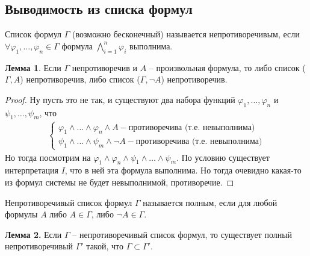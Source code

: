 \subsection{Выводимость из списка формул}
\begin{conj}
    Список формул $\Gamma$ (возможно бесконечный) называется непротиворечивым, если $\forall \varphi_1, \dots, \varphi_n \in \Gamma$ формула $\bigwedge\limits_{i = 1}^n \varphi_i$ выполнима.
\end{conj}

\vspace{2mm}

\textbf{Лемма 1}. Если $\Gamma$ непротиворечив и $A$ -- произвольная формула, то либо список ($\Gamma, A$) непротиворечив, либо список ($\Gamma, \neg A$) непротиворечив.  

\begin{proof}
    Ну пусть это не так, и существуют два набора функций $\varphi_1, \dots, \varphi_n$ и $\psi_1, \dots, \psi_m$, что \begin{gather*}
        \begin{cases}
            \varphi_1 \land \dots \land \varphi_n \land A - \text{противоречива (т.е. невыполнима)} \\
            \psi_1 \land \dots \land \psi_m \land \neg A - \text{противоречива (т.е. невыполнима)}
        \end{cases}
    \end{gather*}
    \quad Но тогда посмотрим на $\varphi_1 \land \varphi_n \land \psi_1 \land \dots \land \psi_m$. По условию существует интерпретация $I$, что в ней эта формула выполнима. Но тогда очевидно какая-то из формул системы не будет невыполнимой, противоречие.
\end{proof}

\vspace{5mm}

\begin{conj}
    Непротиворечивый список формул $\Gamma$ называется полным, если для любой формулы $A$ либо $A \in \Gamma$, либо $\neg A \in \Gamma$.
\end{conj}

\vspace{2mm}

\textbf{Лемма 2.} Если $\Gamma$ -- непротиворечивый список формул, то существует полный непротиворечивый $\Gamma'$ такой, что $\Gamma \subset \Gamma'$.

